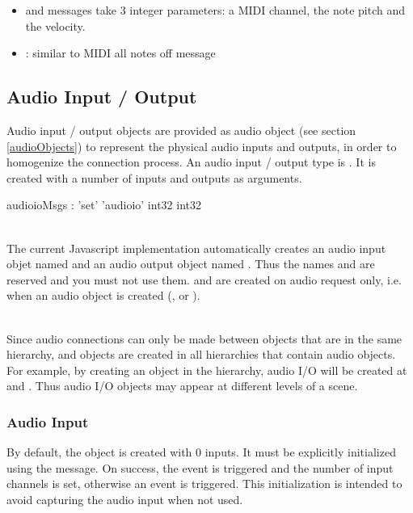 \documentclass[a4paper,twoside]{article}
\newcommand{\sublevel}[1]	{\subsection{#1}}
\newcommand{\subsublevel}[1]	{\subsubsection{#1}}
\begin{document}
\begin{itemize}
\item {} and  messages take 3 integer parameters: a MIDI channel, the note pitch and the velocity.
\item {}: similar to MIDI all notes off message
\end{itemize}

\sublevel{Audio Input / Output}
\label{audioioObjects}

Audio input / output objects are provided as audio object (see section \ref{audioObjects}) to represent the physical audio inputs and outputs, in order to homogenize the connection process.
An audio input / output type is . It is created with a number of inputs and outputs as arguments.

\begin{rail}
audioioMsgs : 'set' 'audioio' int32 int32
\end{rail}

\note\\
The current Javascript implementation automatically creates an audio input objet named  and an audio output object named  . Thus the names  and  are reserved and you must not use them. 
 and  are created on audio request only, i.e. when an audio object is created (,  or ). 

\\
Since audio connections can only be made between objects that are in the same hierarchy,  and  objects are created in all hierarchies that contain audio objects. For example, by creating an  object in the  hierarchy, audio I/O will be created at  and . Thus audio I/O objects may appear at different levels of a scene.
 
\subsublevel{Audio Input}
\label{audioInput}

By default, the  object is created with 0 inputs. It must be explicitly initialized using the  message. On success, the  event is triggered and the number of input channels is set, otherwise an  event is triggered.
This initialization is intended to avoid capturing the audio input when not used. 
\end{document}
